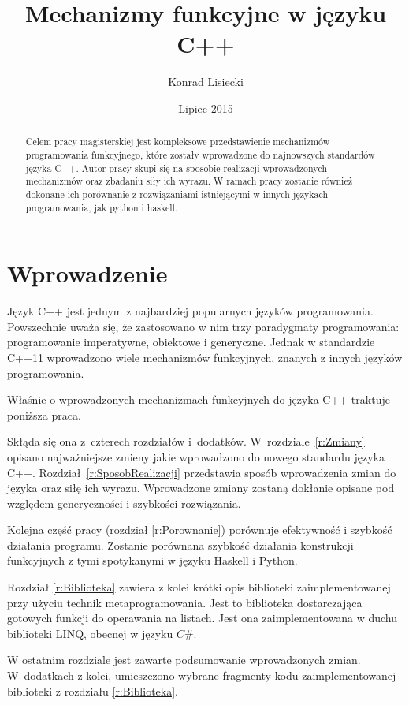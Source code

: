 \documentclass{pracamgr}
\author{Konrad Lisiecki}
\title{Mechanizmy funkcyjne w języku C++}
\date{Lipiec 2015}
\begin{document}
\maketitle

\begin{abstract}
Celem pracy magisterskiej jest kompleksowe przedstawienie mechanizmów programowania 
funkcyjnego, które zostały wprowadzone do najnowszych standardów języka C++. Autor pracy skupi się
na sposobie realizacji wprowadzonych mechanizmów oraz zbadaniu siły ich wyrazu. 
W ramach pracy zostanie również dokonane ich porównanie z rozwiązaniami istniejącymi w innych 
językach programowania, jak python i haskell.
\end{abstract}


\tableofcontents


\chapter*{Wprowadzenie}


Język C++ jest jednym z najbardziej popularnych języków programowania.
Powszechnie uważa się, że zastosowano w nim trzy paradygmaty programowania: programowanie imperatywne, obiektowe i generyczne.
Jednak w standardzie C++11 wprowadzono wiele mechanizmów funkcyjnych, znanych z innych języków programowania.

Właśnie o wprowadzonych mechanizmach funkcyjnych do języka C++ traktuje poniższa praca.

Skłąda się ona z~czterech rozdziałów i~dodatków.
W~rozdziale~\ref{r:Zmiany} opisano najważniejsze zmieny jakie wprowadzono do nowego standardu języka C++.
Rozdział~\ref{r:SposobRealizacji} przedstawia sposób wprowadzenia zmian do języka oraz siłę ich wyrazu. 
Wprowadzone zmiany zostaną dokłanie opisane pod względem generyczności i szybkości rozwiązania.


Kolejna część pracy (rozdział \ref{r:Porownanie}) porównuje efektywność i szybkość działania programu.
Zostanie porównana szybkość działania konstrukcji funkcyjnych z tymi spotykanymi w języku Haskell i Python.

Rozdział \ref{r:Biblioteka} zawiera z kolei krótki opis biblioteki zaimplementowanej przy użyciu technik 
metaprogramowania. Jest to biblioteka dostarczająca gotowych funkcji do operawania na listach. Jest ona 
zaimplementowana w duchu biblioteki LINQ, obecnej w języku $C\#$. 


W ostatnim rozdziale jest zawarte podsumowanie wprowadzonych zmian. 
W~dodatkach z kolei, umieszczono wybrane fragmenty kodu zaimplementowanej biblioteki z rozdziału \ref{r:Biblioteka}.
\end{document}
